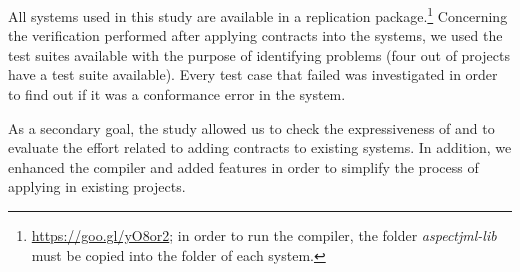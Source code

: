 All systems used in this study are available in a replication
package.\footnote{\url{https://goo.gl/yO8or2}; in order to run the
\contractjdoc{} compiler, the folder \textit{aspectjml-lib} must be copied into the folder of each system.}
Concerning the verification performed after applying \contractjdoc{} contracts into the systems,
we used the test suites available with the purpose of identifying problems
(four out of \totalSystems{} projects have a test suite available).
Every test case that failed was investigated in order to find out if it was a conformance error in the system.

As a secondary goal, the study allowed us to check the expressiveness of \contractjdoc{} and to
evaluate the effort related to adding contracts to existing systems.
In addition, we enhanced the compiler and added features in order to simplify
the process of applying \contractjdoc{} in existing projects.

